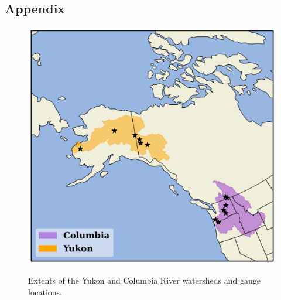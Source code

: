 \newpage
\subsection{Appendix}

\begin{figure}[!ht]
	\centering
    \caption{Extents of the Yukon and Columbia River watersheds and gauge locations.}  
	\includegraphics[width=1.0\linewidth]{m3/ims/fig3_1.png}
    \label{fig3_1}
\end{figure}

